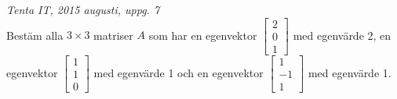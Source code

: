 {\it Tenta IT, 2015 augusti, uppg. 7}\\
Bestäm alla $3\times 3$ matriser $A$ som har en egenvektor $\begin{bmatrix}2\\0\\1\end{bmatrix}$ med egenvärde 2, en egenvektor $\begin{bmatrix}1\\1\\0\end{bmatrix}$ med egenvärde 1 och en egenvektor $\begin{bmatrix}1\\-1\\1\end{bmatrix}$ med egenvärde 1.
